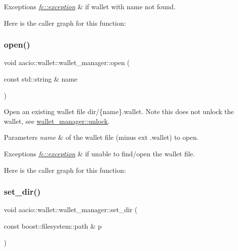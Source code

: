 \begin{DoxyExceptions}{Exceptions}
{\em \mbox{\hyperlink{classfc_1_1exception}{fc\+::exception}}} & if wallet with name not found. \\
\hline
\end{DoxyExceptions}
Here is the caller graph for this function\+:
\mbox{\label{classaacio_1_1wallet_1_1wallet__manager_aa0fecf0fb922ca2baeac6f2ff049d6a1}} 
\subsubsection{\texorpdfstring{open()}{open()}}
{\footnotesize\ttfamily void aacio\+::wallet\+::wallet\+\_\+manager\+::open (\begin{DoxyParamCaption}\item[{const std\+::string \&}]{name }\end{DoxyParamCaption})}

Open an existing wallet file dir/\{name\}.wallet. Note this does not unlock the wallet, see \mbox{\hyperlink{classaacio_1_1wallet_1_1wallet__manager_a9ba50fc7c2965c28ccbdeaf82bf818e1}{wallet\+\_\+manager\+::unlock}}. 
\begin{DoxyParams}{Parameters}
{\em name} & of the wallet file (minus ext .wallet) to open. \\
\hline
\end{DoxyParams}

\begin{DoxyExceptions}{Exceptions}
{\em \mbox{\hyperlink{classfc_1_1exception}{fc\+::exception}}} & if unable to find/open the wallet file. \\
\hline
\end{DoxyExceptions}
Here is the caller graph for this function\+:
\mbox{\label{classaacio_1_1wallet_1_1wallet__manager_a06718c234c36be68c39f63d343eb5289}} 
\subsubsection{\texorpdfstring{set\+\_\+dir()}{set\_dir()}}
{\footnotesize\ttfamily void aacio\+::wallet\+::wallet\+\_\+manager\+::set\+\_\+dir (\begin{DoxyParamCaption}\item[{const boost\+::filesystem\+::path \&}]{p }\end{DoxyParamCaption})\hspace{0.3cm}{\ttfamily [inline]}}

